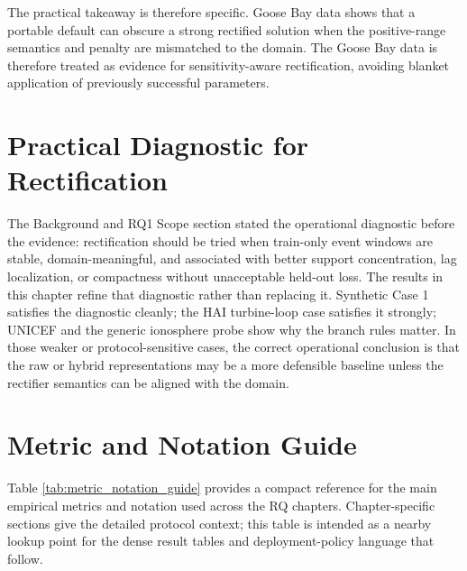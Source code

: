 The practical takeaway is therefore specific. Goose Bay data shows that a portable default can obscure a strong rectified solution when the positive-range semantics and penalty are mismatched to the domain. The Goose Bay data is therefore treated as evidence for sensitivity-aware rectification, avoiding blanket application of previously successful parameters.

\section{Practical Diagnostic for Rectification}
 
The Background and RQ1 Scope section stated the operational diagnostic before the evidence: rectification should be tried when train-only event windows are stable, domain-meaningful, and associated with better support concentration, lag localization, or compactness without unacceptable held-out loss. The results in this chapter refine that diagnostic rather than replacing it. Synthetic Case 1 satisfies the diagnostic cleanly; the HAI turbine-loop case satisfies it strongly; UNICEF and the generic ionosphere probe show why the branch rules matter. In those weaker or protocol-sensitive cases, the correct operational conclusion is that the raw or hybrid representations may be a more defensible baseline unless the rectifier semantics can be aligned with the domain.

\FloatBarrier
\section{Metric and Notation Guide}

Table \ref{tab:metric_notation_guide} provides a compact reference for the main empirical metrics and notation used across the RQ chapters. Chapter-specific sections give the detailed protocol context; this table is intended as a nearby lookup point for the dense result tables and deployment-policy language that follow.

